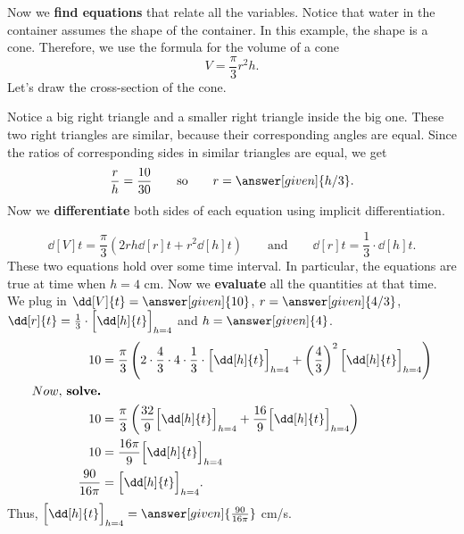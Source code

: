 \documentclass{ximera}
\begin{document}
\begin{example}
\begin{explanation}
Now we \textbf{find equations} that relate all the variables. Notice that water in the container assumes the shape of the container. In this example, the shape is a cone. Therefore, we use the formula for the volume of
a cone 
\[
V = \frac{\pi}{3} r^2 h.
\]
Let's draw the cross-section of the cone.
\begin{image}
\end{image}
Notice a big right triangle and  a smaller right triangle inside the big one.
These two right triangles are similar, because their corresponding angles are equal.
Since the ratios of corresponding sides in similar triangles are equal, we get
\[
\frac{r}{h}=\frac{10}{30} \qquad\text{so}\qquad r=\answer[given]{h/3}.
\]  
Now we  \textbf{differentiate} both sides of each equation using
implicit differentiation.

\[
\dd[V]{t} = \frac{\pi}{3}\left(2rh \dd[r]{t} + r^2 \dd[h]{t}\right)
\qquad\text{and}\qquad \dd[r]{t} = \frac{1}{3}\cdot \dd[h]{t}.
\]
These two equations hold over some time interval. In particular, the equations are true at time when $h=4$ cm. 
Now we \textbf{evaluate} all the quantities at that time. We plug in $\dd[V]{t} =
\answer[given]{10}$, $r = \answer[given]{4/3}$, $\dd[r]{t} = \frac{1}{3}\cdot \Bigl[\dd[h]{t}\Bigr]_{h=4}$ and
$h=\answer[given]{4}$.
\begin{align*}
10 &= \frac{\pi}{3}\left(2\cdot \frac{4}{3}\cdot 4 \cdot\frac{1}{3}\cdot\Bigl[\dd[h]{t}\Bigr]_{h=4} + \left(\frac{4}{3}\right)^2 \Bigl[\dd[h]{t}\Bigr]_{h=4}\right)\\Now,\hspace{0.025in}\textbf{solve.}\\
10 &= \frac{\pi}{3}\left(\frac{32}{9}\Bigl[\dd[h]{t}\Bigr]_{h=4} + \frac{16}{9} \Bigl[\dd[h]{t}\Bigr]_{h=4}\right)\\ 
10 &= \frac{16\pi}{9}\Bigl[\dd[h]{t}\Bigr]_{h=4}\\
\frac{90}{16\pi} &= \Bigl[\dd[h]{t}\Bigr]_{h=4}.
\end{align*}
Thus, $\Bigl[\dd[h]{t}\Bigr]_{h=4}=\answer[given]{\frac{90}{16\pi}}$ cm/s.
\end{explanation}
\end{example}
\end{document}
